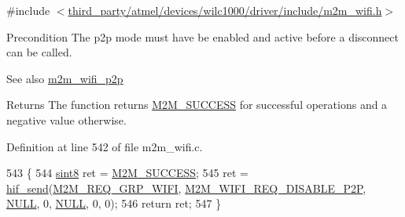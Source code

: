 {\ttfamily \#include $<$\hyperlink{m2m__wifi_8h}{third\+\_\+party/atmel/devices/wilc1000/driver/include/m2m\+\_\+wifi.\+h}$>$}

\begin{DoxyPrecond}{Precondition}
The p2p mode must have be enabled and active before a disconnect can be called. 
\end{DoxyPrecond}
\begin{DoxySeeAlso}{See also}
\hyperlink{group__WifiP2PFn_ga9d2daba93e1e2e33bde42edd359eb2f2}{m2m\+\_\+wifi\+\_\+p2p} 
\end{DoxySeeAlso}
\begin{DoxyReturn}{Returns}
The function returns \hyperlink{nm__common_8h_a9ef27ba27aafdd1aa3a79d3ba2c36b8f}{M2\+M\+\_\+\+S\+U\+C\+C\+E\+SS} for successful operations and a negative value otherwise. 
\end{DoxyReturn}


Definition at line 542 of file m2m\+\_\+wifi.\+c.


\begin{DoxyCode}
543 \{
544     \hyperlink{group__DataT_gae35f10ffd0ac8dd2bc3e794da9bdfbc7}{sint8} ret = \hyperlink{nm__common_8h_a9ef27ba27aafdd1aa3a79d3ba2c36b8f}{M2M\_SUCCESS};
545     ret = \hyperlink{m2m__hif_8c_a13ba8ad11b2ac39516ca787386d16ce0}{hif\_send}(\hyperlink{nm__common_8h_a9ab02eb1aea02a75c3f5aade4eef1276aeb9a7d57324ba4b8a6c2a5f46dd499c2}{M2M\_REQ\_GRP\_WIFI}, 
      \hyperlink{group__WlanEnums_ggac07a15ce7dd9a5508a5cff22ce91f65caec58cbf2b3cca544d7e7015b42249f2f}{M2M\_WIFI\_REQ\_DISABLE\_P2P}, \hyperlink{group__BSPDefine_ga070d2ce7b6bb7e5c05602aa8c308d0c4}{NULL}, 0, \hyperlink{group__BSPDefine_ga070d2ce7b6bb7e5c05602aa8c308d0c4}{NULL}, 0, 0);
546     \textcolor{keywordflow}{return} ret;
547 \}
\end{DoxyCode}
